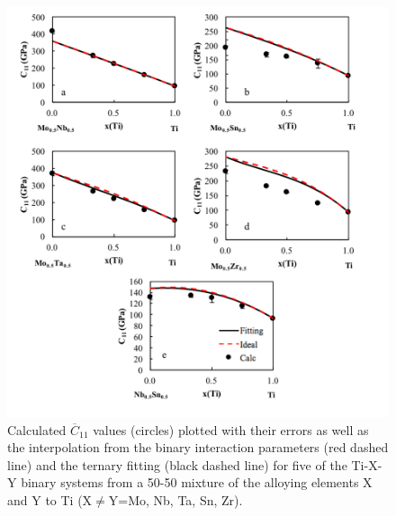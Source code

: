 \pagebreak
\begin{figure}[H]
	\centering
	\includegraphics[width=\textwidth]{Chapter-6/Figures/tixyc11_1.png}
	\caption{Calculated $\overline{C}_{11}$ values (circles) plotted with their errors as well as the interpolation from the binary interaction parameters (red dashed line) and the ternary fitting (black dashed line) for five of the Ti-X-Y binary systems from a 50-50 mixture of the alloying elements X and Y to Ti (X$\neq$Y=Mo, Nb, Ta, Sn, Zr).}
	\label{Ch6-figure:tixyc11_1}
\end{figure}

